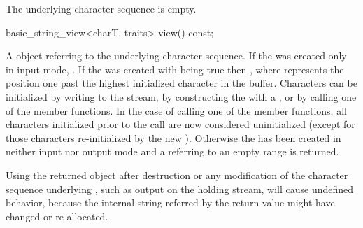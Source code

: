 \documentclass[ebook,11pt,article]{memoir}
\begin{document}
\begin{insrt}
\begin{itemdescr}
\pnum
\postconditions The underlying character sequence is empty.
\end{itemdescr}

\begin{itemdecl}
basic_string_view<charT, traits> view() const;
\end{itemdecl}
\begin{itemdescr}
\pnum
\returns A  object referring to the  underlying character sequence. If the  was created only in input mode,  . If the  was created with  being true then , where  represents the position one past the highest initialized character in the buffer. Characters can be initialized by writing to the stream, by constructing the  with a , or by calling one of the  member functions. In the case of calling one of the  member functions, all characters initialized prior to the call are now considered uninitialized (except for those characters re-initialized by the new ). Otherwise the  has been created in neither input nor output mode and a  referring to an empty range is returned. 

\pnum
\begin{note}
Using the returned  object after destruction or any modification of the character sequence underlying , such as output on the holding stream, will cause undefined behavior, because the internal string referred by the return value might have changed or re-allocated. 
\end{note}
\end{itemdescr}

\end{insrt}
\end{document}
